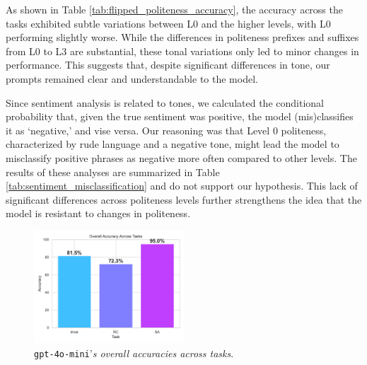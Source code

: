 \documentclass[11pt]{article}
\begin{document}
\begin{table}[h!]
\centering
{}
\caption{Accuracy across different tasks for varying levels of politeness (0 to 3).}
\label{tab:flipped_politeness_accuracy}
\end{table}
As shown in Table \ref{tab:flipped_politeness_accuracy}, the accuracy across the tasks exhibited subtle variations between L0 and the higher levels, with L0 performing slightly worse. While the differences in politeness prefixes and suffixes from L0 to L3 are substantial, these tonal variations only led to minor changes in performance. This suggests that, despite significant differences in tone, our prompts remained clear and understandable to the model.

Since sentiment analysis is related to tones, we calculated the conditional probability that, given the true sentiment was positive, the model (mis)classifies it as `negative,' and vise versa. Our reasoning was that Level 0 politeness, characterized by rude language and a negative tone, might lead the model to misclassify positive phrases as negative more often compared to other levels. The results of these analyses are summarized in Table  \ref{tab:sentiment_misclassification} and
do not support our hypothesis. This lack of significant differences across politeness levels further strengthens the idea that the model is resistant to changes in politeness.

\begin{figure}[h!]
    \centering
    \includegraphics[width=0.50\textwidth]{accuracy_across_tasks.pdf}
    \caption{\texttt{gpt-4o-mini}'\textit{s overall accuracies across tasks}.}
    \label{fig:accuracies-per-tasks}
\end{figure}
\end{document}
